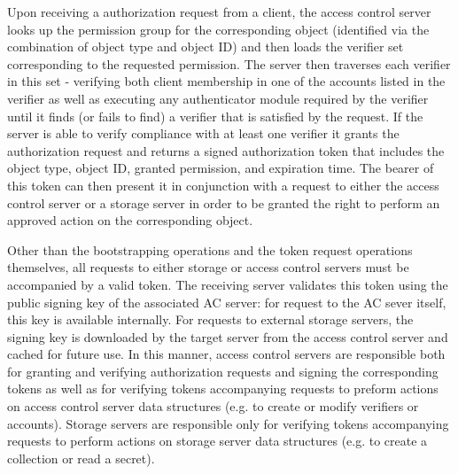 

Upon receiving a authorization request from a client, the access
control server looks up the permission group for the corresponding
object (identified via the combination of object type and object ID)
and then loads the verifier set corresponding to the requested
permission. The server then traverses each verifier in this set -
verifying both client membership in one of the accounts listed in the
verifier as well as executing any authenticator module required by the
verifier until it finds (or fails to find) a verifier that is
satisfied by the request. If the server is able to verify compliance
with at least one verifier it grants the authorization request and
returns a signed authorization token that includes the object type,
object ID, granted permission, and expiration time. The bearer of this
token can then present it in conjunction with a request to either the
access control server or a storage server in order to be granted the
right to perform an approved action on the corresponding object.

Other than the bootstrapping operations and the token request
operations themselves, all requests to either storage or access
control servers must be accompanied by a valid token. The receiving
server validates this token using the public signing key of the
associated AC server: for request to the AC sever itself, this key is
available internally. For requests to external storage servers, the
signing key is downloaded by the target server from the access control
server and cached for future use. In this manner, access control
servers are responsible both for granting and verifying authorization
requests and signing the corresponding tokens as well as for verifying
tokens accompanying requests to preform actions on access control
server data structures (e.g. to create or modify verifiers or
accounts). Storage servers are responsible only for verifying tokens
accompanying requests to perform actions on storage server data
structures (e.g. to create a collection or read a secret).

